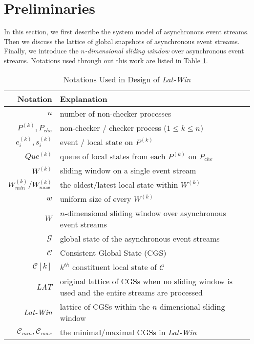 \documentclass[12pt,journal,letterpaper,compsoc]{IEEEtran}
\begin{document}
\section{Preliminaries}
\label{sec:preliminaries}

In this section, we first describe the system model of asynchronous event streams. Then we discuss the lattice of global snapshots of asynchronous event streams. Finally, we introduce the {\it $n$-dimensional sliding window} over asynchronous event streams. Notations used through out this work are listed in Table \ref{T:Notations-Model}.
\begin{table}[htbp]
\caption{Notations Used in Design of {\it Lat-Win}}
\label{T:Notations-Model} \centering
\begin{tabular}{r | l}
\hline
Notation & Explanation \\
\hline
\hline

$n$ & number of non-checker processes \\

$P^{(k)}, P_{che}$ & non-checker / checker process ($1\leq k\leq n$) \\

$e^{(k)}_i, s^{(k)}_i$ & event / local state on $P^{(k)}$ \\

$Que^{(k)}$ & queue of local states from each $P^{(k)}$ on $P_{che}$ \\

$W^{(k)}$ & sliding window on a single event stream \\

$W^{(k)}_{min} / W^{(k)}_{max}$ & the oldest/latest local state within $W^{(k)}$ \\

$w$ & uniform size of every $W^{(k)}$ \\

$W$ & $n$-dimensional sliding window over asynchronous event streams \\

$\mathcal{G}$ & global state of the asynchronous event streams \\

$\mathcal{C}$ & Consistent Global State (CGS) \\

$\mathcal{C}[k]$ & $k^{th}$ constituent local state of $\mathcal{C}$ \\

{\it LAT} & original lattice of CGSs when no sliding window is used and the entire streams are processed \\

{\it Lat-Win} & lattice of CGSs within the $n$-dimensional sliding window \\

$\mathcal{C}_{min}, \mathcal{C}_{max}$ &  the minimal/maximal CGSs in {\it Lat-Win} \\

\hline
\end{tabular}
\end{table}
\end{document}
